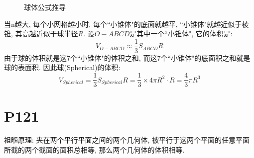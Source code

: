 \documentclass{book}
\begin{document}
    \begin{figure}[htbp]
        \centering            %
        \caption{球体公式推导}    %
        \label{fig:subfig_1}            %
    \end{figure}

    当n越大, 每个小网格越小时, 每个``小锥体"的底面就越平, ``小锥体"就越近似于棱锥, 其高越近似于球半径$R$. 设$O-ABCD$是其中一个``小锥体", 它的体积是:
    $$
        V_{O-ABCD}\approx \frac{1}{3}S_{ABCD}R
    $$
    由于球的体积就是这7个``小锥体"的体积之和, 而这7个``小锥体"的底面积之和就是球的表面积. 因此球(Spherical)的体积:
    $$
        V_{Spherical} = \frac{1}{3}S_{Spherical}R=\frac{1}{3}\times 4\pi R^2\cdot R=\frac{4}{3}\pi R^3
    $$
    \section{\textcolor[rgb]{0.11,0.65,0.52}{P121}}
    \textcolor[rgb]{0.38,0.11,0.2}{祖暅原理}: 夹在两个平行平面之间的两个几何体, 被平行于这两个平面的任意平面所截的两个截面的面积总相等, 那么两个几何体的体积相等.
\end{document}
